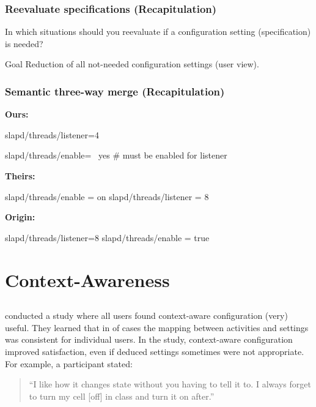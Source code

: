 \begin{frame}
	\frametitle{Reevaluate specifications (Recapitulation)}

	\begin{task}
	In which situations should you reevaluate if a configuration setting (specification) is needed?
	\end{task}

	\pause


	\begin{alertblock}{Goal}
	Reduction of all not-needed configuration settings (user view).
	\end{alertblock}
\end{frame}

\begin{frame}[fragile]
	\frametitle{Semantic three-way merge (Recapitulation)}

	\textbf{Ours:}
	\begin{code}[gobble=4,language=CfgElektra]
	slapd/threads/listener=4

	slapd/threads/enable= \
		yes # must be enabled for listener

	\end{code}

	\textbf{Theirs:}
	\begin{code}[gobble=4,language=CfgElektra]
	slapd/threads/enable = on
	slapd/threads/listener = 8
	\end{code}

	\textbf{Origin:}
	\begin{code}[gobble=4,language=CfgElektra]
	slapd/threads/listener=8
	slapd/threads/enable = true
	\end{code}
\end{frame}

\section{Context-Awareness}

\subsection{}

\begin{frame}
	\citet{khalil2005context} conducted a study where all users found context-aware configuration (very) useful.
	They learned that in \p{89} of cases the mapping between activities and settings was consistent for individual users.
	In the study, context-aware configuration improved satisfaction, even if deduced settings sometimes were not appropriate.
	For example, a participant stated:
	\vspace{2em}

	\begin{quote}
	``I like how it changes state without you having to tell it to. I always forget to turn my cell [off] in class and turn it on after.''
	\end{quote}
\end{frame}

